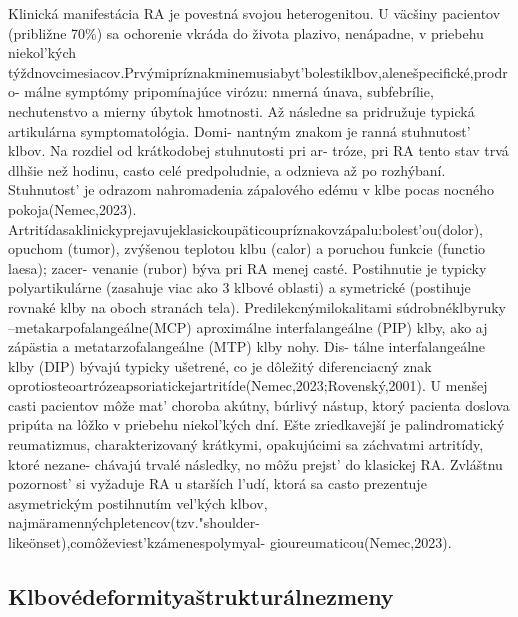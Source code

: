 Klinická manifestácia RA je povestná svojou heterogenitou. U väcšiny pacientov (približne 70\%) sa ochorenie vkráda do života plazivo, nenápadne, v priebehu niekol’kých týždnovcimesiacov.Prvýmipríznakminemusiabyt’bolestiklbov,alenešpecifické,prodro- málne symptómy pripomínajúce virózu: nmerná únava, subfebrílie, nechutenstvo a mierny úbytok hmotnosti. Až následne sa pridružuje typická artikulárna symptomatológia. Domi- nantným znakom je ranná stuhnutost’ klbov. Na rozdiel od krátkodobej stuhnutosti pri ar- tróze, pri RA tento stav trvá dlhšie než hodinu, casto celé predpoludnie, a odznieva až po rozhýbaní. Stuhnutost’ je odrazom nahromadenia zápalového edému v klbe pocas nocného pokoja(Nemec,2023). Artritídasaklinickyprejavujeklasickoupäticoupríznakovzápalu:bolest’ou(dolor), opuchom (tumor), zvýšenou teplotou klbu (calor) a poruchou funkcie (functio laesa); zacer- venanie (rubor) býva pri RA menej casté. Postihnutie je typicky polyartikulárne (zasahuje viac ako 3 klbové oblasti) a symetrické (postihuje rovnaké klby na oboch stranách tela). Predilekcnýmilokalitami súdrobnéklbyruky --metakarpofalangeálne(MCP) aproximálne interfalangeálne (PIP) klby, ako aj zápästia a metatarzofalangeálne (MTP) klby nohy. Dis- tálne interfalangeálne klby (DIP) bývajú typicky ušetrené, co je dôležitý diferenciacný znak oprotiosteoartrózeapsoriatickejartritíde(Nemec,2023;Rovenský,2001). U menšej casti pacientov môže mat’ choroba akútny, búrlivý nástup, ktorý pacienta doslova pripúta na lôžko v priebehu niekol’kých dní. Ešte zriedkavejší je palindromatický reumatizmus, charakterizovaný krátkymi, opakujúcimi sa záchvatmi artritídy, ktoré nezane- chávajú trvalé následky, no môžu prejst’ do klasickej RA. Zvláštnu pozornost’ si vyžaduje RA u starších l’udí, ktorá sa casto prezentuje asymetrickým postihnutím vel’kých klbov, najmäramennýchpletencov(tzv."shoulder-likeönset),comôževiest’kzámenespolymyal- gioureumaticou(Nemec,2023).


\subsection{Klbovédeformityaštrukturálnezmeny}

